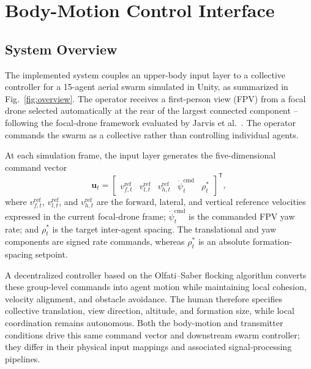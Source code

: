 \documentclass[conference, a4paper]{IEEEtran}
\begin{document}
\section{Body-Motion Control Interface}
\subsection{System Overview}
\label{sec:system}

The implemented system couples an upper-body input layer to a collective
controller for a 15-agent aerial swarm simulated in Unity, as summarized in
Fig.~\ref{fig:overview}. The operator receives a first-person view (FPV) from
a focal drone selected automatically at the rear of the largest connected
component -- following the focal-drone framework evaluated
by Jarvis et al.~\cite{ben_focaldrone}. The operator commands the swarm as a
collective rather than controlling individual agents.

At each simulation frame, the input layer generates the five-dimensional
command vector
\begin{equation}
\mathbf{u}_t =
\begin{bmatrix}
v_{f,t}^{\mathrm{ref}} &
v_{l,t}^{\mathrm{ref}} &
v_{h,t}^{\mathrm{ref}} &
\dot{\psi}_{t}^{\mathrm{cmd}} &
\rho_t^{*}
\end{bmatrix}^{\mathsf{T}},
\label{eq:swarm_command}
\end{equation}
where $v_{f,t}^{\mathrm{ref}}$, $v_{l,t}^{\mathrm{ref}}$, and
$v_{h,t}^{\mathrm{ref}}$ are the forward, lateral, and vertical reference
velocities expressed in the current focal-drone frame;
$\dot{\psi}_{t}^{\mathrm{cmd}}$ is the commanded FPV yaw rate; and
$\rho_t^{*}$ is the target inter-agent spacing. The translational and yaw
components are signed rate commands, whereas $\rho_t^{*}$ is an absolute
formation-spacing setpoint.

A decentralized controller based on the Olfati--Saber flocking algorithm
\cite{olfatisaber2006flocking} converts these group-level commands into
agent motion while maintaining local cohesion, velocity alignment, and
obstacle avoidance. The human therefore specifies collective translation,
view direction, altitude, and formation size, while local coordination remains
autonomous. Both the body-motion and transmitter conditions drive this same
command vector and downstream swarm controller; they differ in their physical
input mappings and associated signal-processing pipelines.
\end{document}
